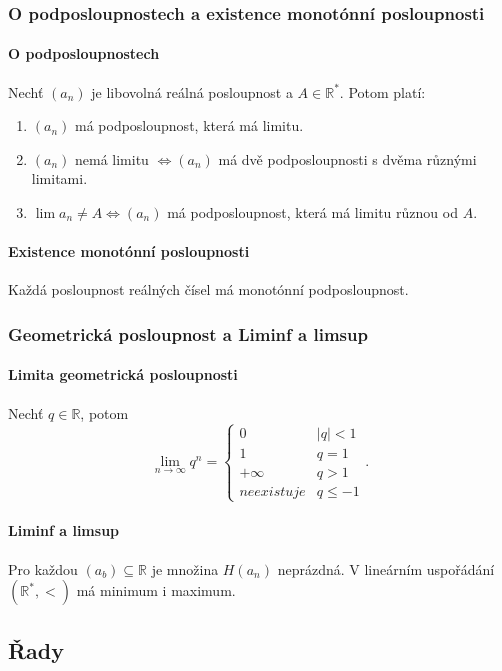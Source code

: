 \documentclass[10pt,a4paper]{article}
\newcommand{\R}{{\mathbb{R}}}
\begin{document}
\subsubsection{O podposloupnostech a existence monotónní posloupnosti}

\paragraph*{O podposloupnostech} Nechť $(a_n)$ je libovolná reálná posloupnost a $A\in \R^*$. Potom platí:
\begin{enumerate}
    \item $(a_n)$ má podposloupnost, která má limitu.
    \item $(a_n)$ nemá limitu $\iff (a_n)$ má dvě podposloupnosti s dvěma různými limitami.
    \item $\lim a_n \neq A \iff (a_n)$ má podposloupnost, která má limitu různou od $A$.
\end{enumerate}

\paragraph*{Existence monotónní posloupnosti} Každá posloupnost reálných čísel má monotónní podposloupnost.

\subsubsection{Geometrická posloupnost a Liminf a limsup}

\paragraph*{Limita geometrická posloupnosti} Nechť $q \in \R$, potom
\[
    \lim_{n\to \infty}q^n = \begin{cases}
        0 & |q|<1\\
        1 & q = 1\\
        +\infty & q>1\\
        \textit{neexistuje} & q \leq -1
    \end{cases}.
\]
\paragraph*{Liminf a limsup} Pro každou $(a_b)\subseteq \R$ je množina $H(a_n)$ neprázdná. V lineárním uspořádání $(\R^*, <)$ má minimum i maximum.

\subsection{Řady}
\end{document}
